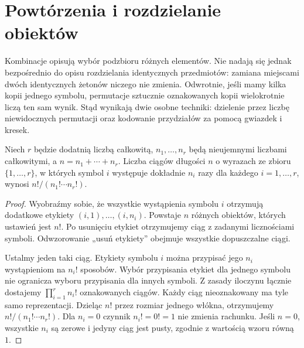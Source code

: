 \section{Powtórzenia i rozdzielanie obiektów}
Kombinacje opisują wybór podzbioru różnych elementów. Nie nadają
się jednak bezpośrednio do opisu rozdzielania identycznych przedmiotów:
zamiana miejscami dwóch identycznych żetonów niczego nie zmienia.
Odwrotnie, jeśli mamy kilka kopii jednego symbolu, permutacje
sztucznie oznakowanych kopii wielokrotnie liczą ten sam wynik.
Stąd wynikają dwie osobne techniki: dzielenie przez liczbę
niewidocznych permutacji oraz kodowanie przydziałów
za pomocą gwiazdek i kresek.

\begin{twierdzenie}
Niech $r$ będzie dodatnią liczbą całkowitą,
$n_1,\ldots,n_r$ będą nieujemnymi liczbami całkowitymi, a
$n=n_1+\cdots+n_r$. Liczba ciągów długości $n$ o wyrazach ze zbioru
$\{1,\ldots,r\}$, w których symbol $i$
występuje dokładnie $n_i$ razy dla każdego $i=1,\ldots,r$, wynosi
$n!/(n_1!\cdots n_r!)$.
\end{twierdzenie}
\begin{proof}
Wyobraźmy sobie, że wszystkie wystąpienia symbolu $i$
otrzymują dodatkowe etykiety $(i,1),\ldots,(i,n_i)$.
Powstaje $n$ różnych obiektów, których ustawień jest $n!$.
Po usunięciu etykiet otrzymujemy ciąg z zadanymi
licznościami symboli. Odwzorowanie „usuń etykiety”
obejmuje wszystkie dopuszczalne ciągi.

Ustalmy jeden taki ciąg. Etykiety symbolu $i$
można przypisać jego $n_i$ wystąpieniom na $n_i!$
sposobów. Wybór przypisania etykiet dla jednego symbolu nie ogranicza
wyboru przypisania dla innych symboli. Z zasady iloczynu
łącznie dostajemy
$\prod_{i=1}^r n_i!$ oznakowanych ciągów.
Każdy ciąg nieoznakowany ma tyle samo reprezentacji.
Dzieląc $n!$ przez rozmiar jednego włókna, otrzymujemy
$n!/(n_1!\cdots n_r!)$.
Dla $n_i=0$ czynnik $n_i!=0!=1$ nie zmienia rachunku.
Jeśli $n=0$, wszystkie $n_i$ są zerowe i jedyny ciąg jest pusty,
zgodnie z wartością wzoru równą $1$.
\end{proof}


